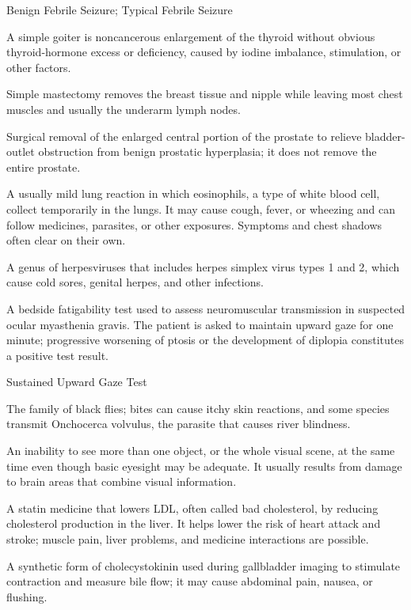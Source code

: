 \synonyms
Benign Febrile Seizure; Typical Febrile Seizure

 A simple goiter is noncancerous enlargement of the thyroid without obvious thyroid-hormone excess or deficiency, caused by iodine imbalance, stimulation, or other factors.

 Simple mastectomy removes the breast tissue and nipple while leaving most chest muscles and usually the underarm lymph nodes.

 Surgical removal of the enlarged central portion of the prostate to relieve bladder-outlet obstruction from benign prostatic hyperplasia; it does not remove the entire prostate.

 A usually mild lung reaction in which eosinophils, a type of white blood cell, collect temporarily in the lungs. It may cause cough, fever, or wheezing and can follow medicines, parasites, or other exposures. Symptoms and chest shadows often clear on their own.

 A genus of herpesviruses that includes herpes simplex virus types 1 and 2, which cause cold sores, genital herpes, and other infections.

 A bedside fatigability test used to assess neuromuscular transmission in suspected ocular myasthenia gravis. The patient is asked to maintain upward gaze for one minute; progressive worsening of ptosis or the development of diplopia constitutes a positive test result.

\synonyms
Sustained Upward Gaze Test

 The family of black flies; bites can cause itchy skin reactions, and some species transmit Onchocerca volvulus, the parasite that causes river blindness.

 An inability to see more than one object, or the whole visual scene, at the same time even though basic eyesight may be adequate. It usually results from damage to brain areas that combine visual information.

 A statin medicine that lowers LDL, often called bad cholesterol, by reducing cholesterol production in the liver. It helps lower the risk of heart attack and stroke; muscle pain, liver problems, and medicine interactions are possible.

 A synthetic form of cholecystokinin used during gallbladder imaging to stimulate contraction and measure bile flow; it may cause abdominal pain, nausea, or flushing.

